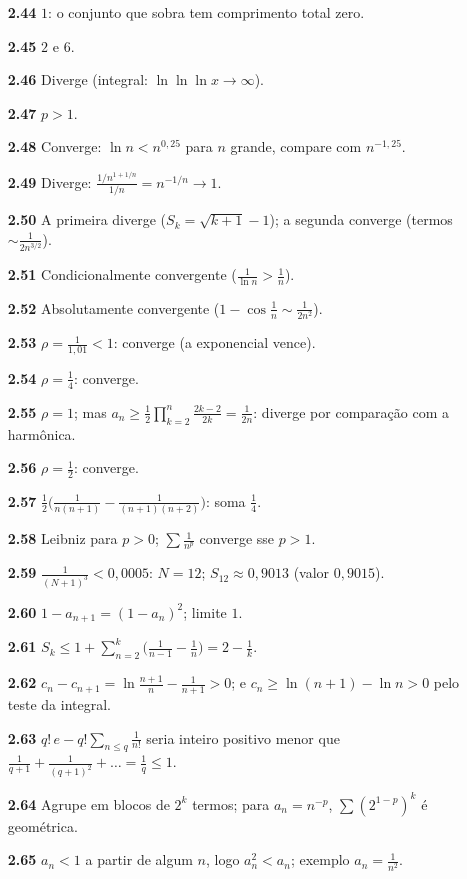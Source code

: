 {\begin{multicols}{2}
\begin{itemize}[leftmargin=2.7em,labelsep=0.5em,itemsep=1pt]
\item[\textbf{2.44}] $1$: o conjunto que sobra tem comprimento total zero.
\item[\textbf{2.45}] $2$ e $6$.
\item[\textbf{2.46}] Diverge (integral: $\ln\ln\ln x\to\infty$).
\item[\textbf{2.47}] $p>1$.
\item[\textbf{2.48}] Converge: $\ln n<n^{0{,}25}$ para $n$ grande, compare com $n^{-1{,}25}$.
\item[\textbf{2.49}] Diverge: $\frac{1/n^{1+1/n}}{1/n}=n^{-1/n}\to1$.
\item[\textbf{2.50}] A primeira diverge ($S_k=\sqrt{k+1}-1$); a segunda converge (termos $\sim\tfrac1{2n^{3/2}}$).
\item[\textbf{2.51}] Condicionalmente convergente ($\tfrac1{\ln n}>\tfrac1n$).
\item[\textbf{2.52}] Absolutamente convergente ($1-\cos\tfrac1n\sim\tfrac1{2n^2}$).
\item[\textbf{2.53}] $\rho=\tfrac1{1{,}01}<1$: converge (a exponencial vence).
\item[\textbf{2.54}] $\rho=\tfrac14$: converge.
\item[\textbf{2.55}] $\rho=1$; mas $a_n\ge\tfrac12\prod_{k=2}^n\tfrac{2k-2}{2k}=\tfrac1{2n}$: diverge por comparação com a harmônica.
\item[\textbf{2.56}] $\rho=\tfrac12$: converge.
\item[\textbf{2.57}] $\tfrac12\big(\tfrac1{n(n+1)}-\tfrac1{(n+1)(n+2)}\big)$: soma $\tfrac14$.
\item[\textbf{2.58}] Leibniz para $p>0$; $\sum\tfrac1{n^p}$ converge sse $p>1$.
\item[\textbf{2.59}] $\tfrac1{(N+1)^3}<0{,}0005$: $N=12$; $S_{12}\approx0{,}9013$ (valor $0{,}9015$).
\item[\textbf{2.60}] $1-a_{n+1}=(1-a_n)^2$; limite $1$.
\item[\textbf{2.61}] $S_k\le1+\sum_{n=2}^k\big(\tfrac1{n-1}-\tfrac1n\big)=2-\tfrac1k$.
\item[\textbf{2.62}] $c_n-c_{n+1}=\ln\tfrac{n+1}n-\tfrac1{n+1}>0$; e $c_n\ge\ln(n+1)-\ln n>0$ pelo teste da integral.
\item[\textbf{2.63}] $q!\,e-q!\sum_{n\le q}\tfrac1{n!}$ seria inteiro positivo menor que $\tfrac1{q+1}+\tfrac1{(q+1)^2}+\dots=\tfrac1q\le1$.
\item[\textbf{2.64}] Agrupe em blocos de $2^k$ termos; para $a_n=n^{-p}$, $\sum(2^{1-p})^k$ é geométrica.
\item[\textbf{2.65}] $a_n<1$ a partir de algum $n$, logo $a_n^2<a_n$; exemplo $a_n=\tfrac1{n^2}$.
\end{itemize}\end{multicols}}
